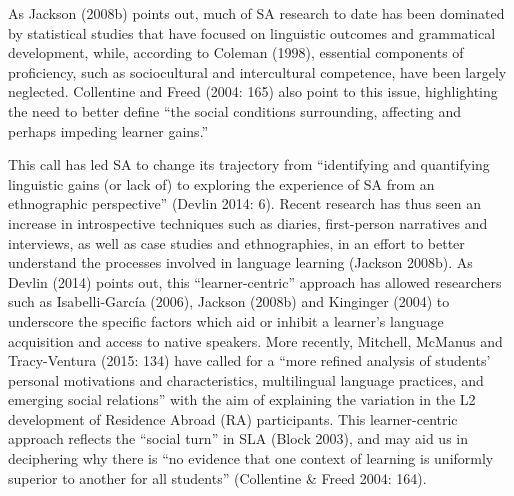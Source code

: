 \documentclass[12pt]{article}
\newenvironment{styleStandard}{\setlength\leftskip{0cm}\setlength\rightskip{0cm plus 1fil}\setlength\parindent{0cm}\setlength\parfillskip{0pt plus 1fil}\setlength\parskip{0in plus 1pt}\writerlistparindent\writerlistleftskip\leavevmode\normalfont\normalsize\writerlistlabel\ignorespaces}{\unskip\vspace{0.111in plus 0.0111in}\par}
\newcommand\writerlistleftskip{}
\newcommand\writerlistparindent{}
\newcommand\writerlistlabel{}
\begin{document}
\begin{styleStandard}
As Jackson (2008b) points out, much of SA research to date has been dominated by statistical studies that have focused on linguistic outcomes and grammatical development, while, according to Coleman (1998), essential components of proficiency, such as sociocultural and intercultural competence, have been largely neglected. Collentine and Freed (2004: 165) also point to this issue, highlighting the need to better define “the social conditions surrounding, affecting and perhaps impeding learner gains.”
\end{styleStandard}

\begin{styleStandard}
This call has led SA to change its trajectory from “identifying and quantifying linguistic gains (or lack of) to exploring the experience of SA from an ethnographic perspective” (Devlin 2014: 6). Recent research has thus seen an increase in introspective techniques such as diaries, first-person narratives and interviews, as well as case studies and ethnographies, in an effort to better understand the processes involved in language learning (Jackson 2008b). As Devlin (2014) points out, this “learner-centric” approach has allowed researchers such as Isabelli-García (2006), Jackson (2008b) and Kinginger (2004) to underscore the specific factors which aid or inhibit a learner’s language acquisition and access to native speakers. More recently, Mitchell, McManus and Tracy-Ventura (2015: 134) have called for a “more refined analysis of students’ personal motivations and characteristics, multilingual language practices, and emerging social relations” with the aim of explaining the variation in the L2 development of Residence Abroad (RA) participants. This learner-centric approach reflects the “social turn” in SLA (Block 2003), and may aid us in deciphering why there is “no evidence that one context of learning is uniformly superior to another for all students” (Collentine \& Freed 2004: 164). 
\end{styleStandard}
\end{document}
